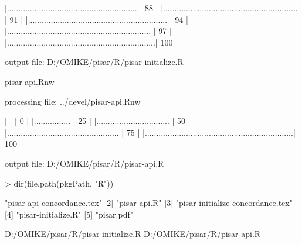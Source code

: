 \documentclass[a4paper,12pt]{article}\usepackage[]{graphicx}\usepackage[]{color}
\begin{document}
\begin{Schunk}
\begin{Soutput}
  |.........................................................        |  88%
  |                                                                       
  |...........................................................      |  91%
  |                                                                       
  |.............................................................    |  94%
  |                                                                       
  |...............................................................  |  97%
  |                                                                       
  |.................................................................| 100%
\end{Soutput}
\begin{Soutput}
output file: D:/OMIKE/pisar/R/pisar-initialize.R
\end{Soutput}
\begin{Soutput}
pisar-api.Rnw 
\end{Soutput}
\begin{Soutput}


processing file: ../devel/pisar-api.Rnw
\end{Soutput}
\begin{Soutput}

  |                                                                       
  |                                                                 |   0%
  |                                                                       
  |................                                                 |  25%
  |                                                                       
  |................................                                 |  50%
  |                                                                       
  |.................................................                |  75%
  |                                                                       
  |.................................................................| 100%
\end{Soutput}
\begin{Soutput}
output file: D:/OMIKE/pisar/R/pisar-api.R
\end{Soutput}
\begin{Sinput}
> dir(file.path(pkgPath, "R"))
\end{Sinput}
\begin{Soutput}
[1] "pisar-api-concordance.tex"       
[2] "pisar-api.R"                     
[3] "pisar-initialize-concordance.tex"
[4] "pisar-initialize.R"              
[5] "pisar.pdf"                       
\end{Soutput}
\end{Schunk}
 D:/OMIKE/pisar/R/pisar-initialize.R D:/OMIKE/pisar/R/pisar-api.R
\end{document}

